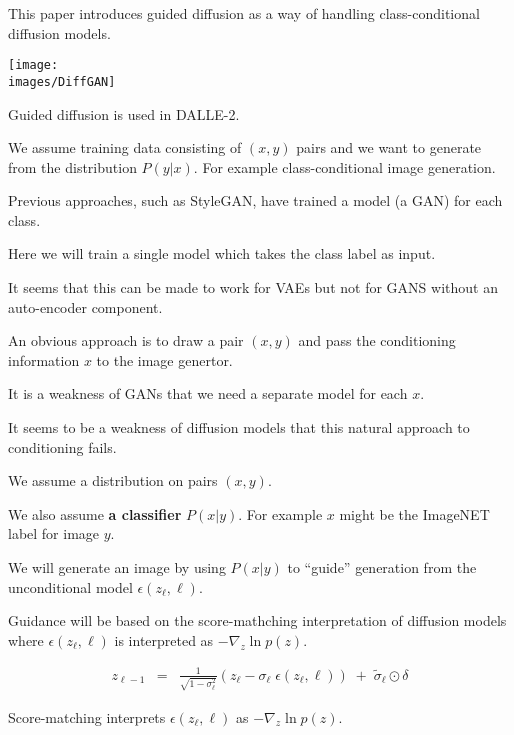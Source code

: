 {This paper introduces guided diffusion as a way of handling class-conditional diffusion models.

\vfill
\centerline{\texttt{[image: \\images/DiffGAN]}}

\vfill
Guided diffusion is used in DALLE-2.


We assume training data consisting of $(x,y)$ pairs and we want to generate from the distribution $P(y|x)$.  For example class-conditional image generation.

\vfill
Previous approaches, such as StyleGAN, have trained a model (a GAN) for each class.

\vfill
Here we will train a single model which takes the class label as input.

\vfill
It seems that this can be made to work for VAEs but not for GANS without an auto-encoder component.


An obvious approach is to draw a pair $(x,y)$ and pass the conditioning information $x$ to the image genertor.

\vfill
It is a weakness of GANs that we need a separate model for each $x$.

\vfill
It seems to be a weakness of diffusion models that this natural approach to conditioning fails.

We assume a distribution on pairs $(x,y)$.

\vfill
We also assume {\bf a classifier} $P(x|y)$.  For example $x$ might be the ImageNET label for image $y$.

\vfill
We will generate an image by using $P(x|y)$ to ``guide'' generation from the unconditional model $\epsilon(z_\ell,\ell)$.

\vfill
Guidance will be based on the score-mathching interpretation of diffusion models where
$\epsilon(z_\ell,\ell)$ is interpreted as $- \nabla_z \ln p(z)$.


{\huge
\begin{eqnarray*}
  z_{\ell-1} & = & \frac{1}{\sqrt{1-\sigma_\ell^2}}\left(z_\ell - \sigma_\ell\; \epsilon(z_\ell,\ell)\right)\; +\; \tilde{\sigma}_\ell\odot\delta
\end{eqnarray*}
}

\vfill
Score-matching interprets $\epsilon(z_\ell,\ell)$ as $- \nabla_z \ln p(z)$.

}
